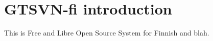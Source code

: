 \documentclass[a5paper,10pt]{article}
\begin{document}
\section*{GTSVN-fi introduction}

This is Free and Libre Open Source System for Finnish and blah.
\end{document}
